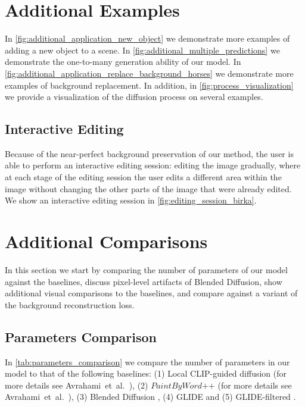 \begin{appendix}

\section{Additional Examples}
\label{sec:additional_examples}

In \ref{fig:additional_application_new_object} we demonstrate more examples of adding a new object to a scene. In \ref{fig:additional_multiple_predictions} we demonstrate the one-to-many generation ability of our model. In \ref{fig:additional_application_replace_background_horses} we demonstrate more examples of background replacement. In addition, in \ref{fig:process_visualization} we provide a visualization of the diffusion process on several examples.

\subsection{Interactive Editing}

Because of the near-perfect background preservation of our method, the user is able to perform an interactive editing session: editing the image gradually, where at each stage of the editing session the user edits a different area within the image without changing the other parts of the image that were already edited. We show an interactive editing session in \ref{fig:editing_session_birka}.

\section{Additional Comparisons} In this section we start by comparing the number of parameters of our model against the baselines, discuss pixel-level artifacts of Blended Diffusion, show additional visual comparisons to the baselines, and compare against a variant of the background reconstruction loss.

\subsection{Parameters Comparison}
\label{sec:parameters_comparison}

In \ref{tab:parameters_comparison} we compare the number of parameters in our model to that of the following baselines: (1) Local CLIP-guided diffusion \cite{clip_guided_diffusion} (for more details see Avrahami~et~al.~), (2) $\textit{PaintByWord++}$ \cite{bau2021paint, crowson2022vqgan} (for more details see Avrahami~et~al.~), (3) Blended Diffusion \cite{avrahami2022blended}, (4) GLIDE \cite{nichol2021glide} and (5) GLIDE-filtered \cite{nichol2021glide}.


\end{appendix}
